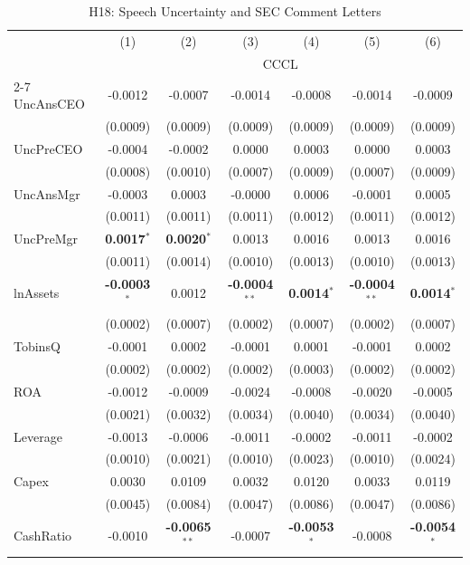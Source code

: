 \documentclass[11pt,a4paper]{article}
\begin{document}
\begin{table}[htbp]
\centering
\caption{H18: Speech Uncertainty and SEC Comment Letters}
\label{tab:h18}
\scriptsize
\begin{tabular}{lcccccc}
\toprule
 & (1) & (2) & (3) & (4) & (5) & (6) \\
 & \multicolumn{6}{c}{CCCL} \\
\cmidrule(lr){2-7}
\midrule
UncAnsCEO & -0.0012 & -0.0007 & -0.0014 & -0.0008 & -0.0014 & -0.0009 \\
 & (0.0009) & (0.0009) & (0.0009) & (0.0009) & (0.0009) & (0.0009) \\
UncPreCEO & -0.0004 & -0.0002 & 0.0000 & 0.0003 & 0.0000 & 0.0003 \\
 & (0.0008) & (0.0010) & (0.0007) & (0.0009) & (0.0007) & (0.0009) \\
UncAnsMgr & -0.0003 & 0.0003 & -0.0000 & 0.0006 & -0.0001 & 0.0005 \\
 & (0.0011) & (0.0011) & (0.0011) & (0.0012) & (0.0011) & (0.0012) \\
UncPreMgr & \textbf{0.0017}$^{*}$ & \textbf{0.0020}$^{*}$ & 0.0013 & 0.0016 & 0.0013 & 0.0016 \\
 & (0.0011) & (0.0014) & (0.0010) & (0.0013) & (0.0010) & (0.0013) \\
\midrule
lnAssets & \textbf{-0.0003}$^{*}$ & 0.0012 & \textbf{-0.0004}$^{**}$ & \textbf{0.0014}$^{*}$ & \textbf{-0.0004}$^{**}$ & \textbf{0.0014}$^{*}$ \\
 & (0.0002) & (0.0007) & (0.0002) & (0.0007) & (0.0002) & (0.0007) \\
TobinsQ & -0.0001 & 0.0002 & -0.0001 & 0.0001 & -0.0001 & 0.0002 \\
 & (0.0002) & (0.0002) & (0.0002) & (0.0003) & (0.0002) & (0.0002) \\
ROA & -0.0012 & -0.0009 & -0.0024 & -0.0008 & -0.0020 & -0.0005 \\
 & (0.0021) & (0.0032) & (0.0034) & (0.0040) & (0.0034) & (0.0040) \\
Leverage & -0.0013 & -0.0006 & -0.0011 & -0.0002 & -0.0011 & -0.0002 \\
 & (0.0010) & (0.0021) & (0.0010) & (0.0023) & (0.0010) & (0.0024) \\
Capex & 0.0030 & 0.0109 & 0.0032 & 0.0120 & 0.0033 & 0.0119 \\
 & (0.0045) & (0.0084) & (0.0047) & (0.0086) & (0.0047) & (0.0086) \\
CashRatio & -0.0010 & \textbf{-0.0065}$^{**}$ & -0.0007 & \textbf{-0.0053}$^{*}$ & -0.0008 & \textbf{-0.0054}$^{*}$ \\

\end{tabular}
\end{table}
\end{document}
